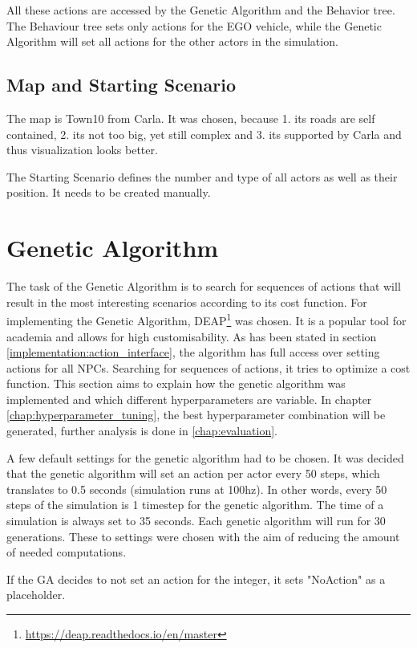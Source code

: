 All these actions are accessed by the Genetic Algorithm and the Behavior tree. The Behaviour tree sets only actions for the EGO vehicle, while the Genetic Algorithm will set all actions for the other actors in the simulation.

\subsection{Map and Starting Scenario}
The map is Town10 from Carla. It was chosen, because 1. its roads are self contained, 2. its not too big, yet still complex and 3. its supported by Carla and thus visualization looks better.

The Starting Scenario defines the number and type of all actors as well as their position. It needs to be created manually.



\section{Genetic Algorithm}
The task of the Genetic Algorithm is to search for sequences of actions that will result in the most interesting scenarios according to its cost function.
For implementing the Genetic Algorithm, DEAP\footnote{\url{https://deap.readthedocs.io/en/master}} was chosen. It is a popular tool for academia and allows for high customisability.
As has been stated in section \ref{implementation:action_interface}, the algorithm has full access over setting actions for all NPCs. Searching for sequences of actions, it tries to optimize a cost function. This section aims to explain how the genetic algorithm was implemented and which different hyperparameters are variable. In chapter \ref{chap:hyperparameter_tuning}, the best hyperparameter combination will be generated, further analysis is done in \ref{chap:evaluation}.

A few default settings for the genetic algorithm had to be chosen. It was decided that the genetic algorithm will set an action per actor every 50 steps, which translates to 0.5 seconds (simulation runs at 100hz). In other words, every 50 steps of the simulation is 1 timestep for the genetic algorithm. The time of a simulation is always set to 35 seconds. Each genetic algorithm will run for 30 generations. These to settings were chosen with the aim of reducing the amount of needed computations.

If the GA decides to not set an action for the integer, it sets "NoAction" as a placeholder.

